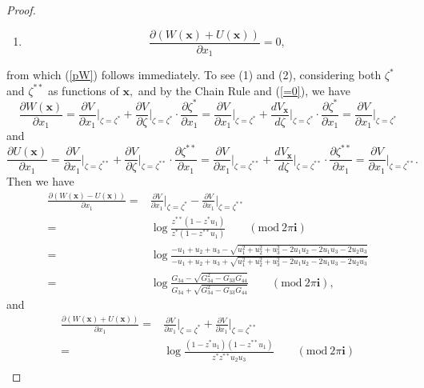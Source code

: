 \documentclass[10pt,a4paper]{amsart}
\begin{document}
\begin{proof}
\begin{enumerate}[(1)]
    \item   $$\frac{\partial (W(\boldsymbol x)+U(\boldsymbol x))}{\partial x_1}=0,$$
\end{enumerate}
from which (\ref{pW}) follows immediately. To see (1) and (2), considering both $\zeta^*$ and $\zeta^{**}$ as functions of $\boldsymbol x,$ and by the Chain Rule and  (\ref{=0}), we have
$$\frac{\partial W(\boldsymbol x)}{\partial x_1}=\frac{\partial V}{\partial x_1}\bigg|_{\zeta=\zeta^*}+\frac{\partial V}{\partial \zeta}\bigg|_{\zeta=\zeta^*}\cdot\frac{\partial \zeta^*}{\partial x_1}=\frac{\partial V}{\partial x_1}\bigg|_{\zeta=\zeta^*}+\frac{d V_{\boldsymbol x}}{d \zeta}\bigg|_{\zeta=\zeta^*}\cdot\frac{\partial \zeta^*}{\partial x_1}=\frac{\partial V}{\partial x_1}\bigg|_{\zeta=\zeta^*}$$
and
$$\frac{\partial U(\boldsymbol x)}{\partial x_1}=\frac{\partial V}{\partial x_1}\bigg|_{\zeta=\zeta^{**}}+\frac{\partial V}{\partial \zeta}\bigg|_{\zeta=\zeta^{**}}\cdot \frac{\partial \zeta^{**}}{\partial x_1}=\frac{\partial V}{\partial x_1}\bigg|_{\zeta=\zeta^{**}}+\frac{d V_{\boldsymbol x}}{d \zeta}\bigg|_{\zeta=\zeta^{**}}\cdot\frac{\partial \zeta^{**}}{\partial x_1}=\frac{\partial V}{\partial x_1}\bigg|_{\zeta=\zeta^{**}}.$$
Then we have 
\begin{equation*}
\begin{split}
\frac{\partial (W(\boldsymbol x)-U(\boldsymbol x))}{\partial x_1} = & \frac{\partial V}{\partial x_1}\bigg|_{\zeta=\zeta^*}-\frac{\partial V}{\partial x_1}\bigg|_{\zeta=\zeta^{**}}\\ 
=& \log \frac{z^{**}(1-z^*u_1)}{z^*(1-z^{**}u_1)}\quad\quad (\mathrm{mod}\ 2\pi\mathbf i)\\
=& \log \frac{-u_1+u_2+u_3 - \sqrt{u_1^2+u_2^2+u_3^2-2u_1u_2-2u_1u_3-2u_2u_3}}{-u_1+u_2+u_3 +\sqrt{u_1^2+u_2^2+u_3^2-2u_1u_2-2u_1u_3-2u_2u_3}}\\
=&  \log\frac{G_{34}-\sqrt{G_{34}^2-G_{33}G_{44}}}{G_{34}+\sqrt{G_{34}^2-G_{33}G_{44}}} \quad\quad (\mathrm{mod}\ 2\pi\mathbf i),
\end{split}
\end{equation*}
and 
\begin{equation*}
\begin{split}
\frac{\partial (W(\boldsymbol x)+U(\boldsymbol x))}{\partial x_1} = & \frac{\partial V}{\partial x_1}\bigg|_{\zeta=\zeta^*}+\frac{\partial V}{\partial x_1}\bigg|_{\zeta=\zeta^{**}}\\ 
=& \log \frac{(1-z^*u_1)(1-z^{**}u_1)}{z^*z^{**}u_2u_3}\quad\quad (\mathrm{mod}\ 2\pi\mathbf i)\\

\end{split}
\end{equation*}
\end{proof}
\end{document}
